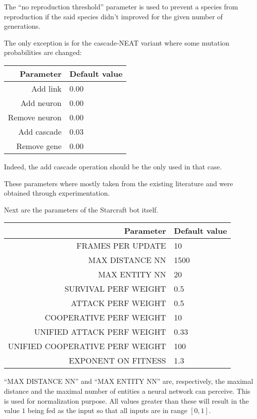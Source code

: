 The ``no reproduction threshold'' parameter is used to prevent a species from
reproduction if the said species didn't improved for the given number of generations.

The only exception is for the cascade-NEAT variant where some mutation probabilities
are changed:

\begin{tabular}{rl}
    \toprule
    Parameter & Default value \\
    \midrule
    Add link & 0.00 \\
    Add neuron & 0.00 \\
    Remove neuron & 0.00 \\
    Add cascade & 0.03 \\
    Remove gene & 0.00 \\
    \bottomrule
\end{tabular}

Indeed, the add cascade operation should be the only used in that case.

These parameters where mostly taken from the existing literature and were obtained
through experimentation.

Next are the parameters of the Starcraft bot itself.

\begin{tabular}{rl}
    \toprule
    Parameter & Default value \\
    \midrule
    FRAMES PER UPDATE & 10 \\
    MAX DISTANCE NN & 1500 \\
    MAX ENTITY NN  & 20 \\[1ex]

    SURVIVAL PERF WEIGHT & 0.5 \\
    ATTACK PERF WEIGHT & 0.5 \\
    COOPERATIVE PERF WEIGHT & 10 \\
    UNIFIED ATTACK PERF WEIGHT & 0.33 \\
    UNIFIED COOPERATIVE PERF WEIGHT & 100 \\
    EXPONENT ON FITNESS & 1.3 \\
    \bottomrule
\end{tabular}

``MAX DISTANCE NN'' and ``MAX ENTITY NN'' are, respectively, the maximal distance and
the maximal number of entities a neural network can perceive.
This is used for normalization purpose. All values greater than these will result in the
value \(1\) being fed as the input so that
all inputs are in range \([0, 1]\).

